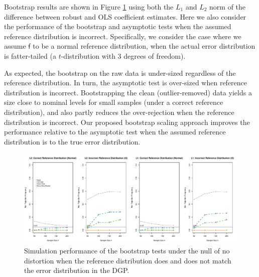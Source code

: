 \documentclass[11pt, letterpaper]{article}
\numberwithin{algorithm}{section}
\numberwithin{assumption}{section}
\numberwithin{lemma}{section}
\numberwithin{theorem}{section}
\numberwithin{corollary}{section}
\numberwithin{remark}{section}
\numberwithin{equation}{section}
\numberwithin{figure}{section}
\numberwithin{table}{section}
\begin{document}

Bootstrap results are shown in Figure \ref{fig_boot_sim_null} using both the $L_{1}$ and $L_{2}$ norm of the difference between robust and OLS coefficient estimates. Here we also consider the performance of the bootstrap and asymptotic tests when the assumed reference distribution is incorrect. Specifically, we consider the case where we assume $\mathsf{f}$ to be a normal reference distribution, when the actual error distribution is fatter-tailed (a $t$-distribution with 3 degrees of freedom).

As expected, the bootstrap on the raw data is under-sized regardless of the reference distribution. In turn, the asymptotic test is over-sized when reference distribution is incorrect. Bootstrapping the clean (outlier-removed) data yields a size close to nominal levels for small samples (under a correct reference distribution), and also partly reduces the over-rejection when the reference distribution is incorrect. Our proposed bootstrap scaling approach improves the performance relative to the asymptotic test when the assumed reference distribution is to the true error distribution.


\begin{figure}[!htbp]  %
\centering
\includegraphics[width=\textwidth]{boot_null.pdf}
\caption{Simulation performance of the bootstrap tests under the null of no distortion when the reference distribution does and does not match the error distribution in the DGP.}
\label{fig_boot_sim_null}
\end{figure}
\end{document}

